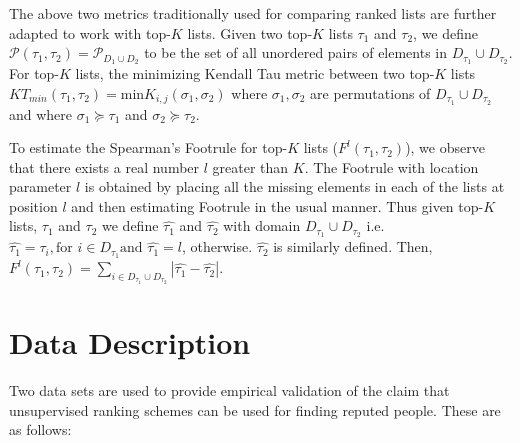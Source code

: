 \documentclass[a4paper,man,natbib]{apa6}
\begin{document}
The above two metrics traditionally used for comparing ranked lists are further adapted to work with top-$K$ lists. Given two top-$K$ lists $\tau_1$ and  $\tau_2$, we define $\mathcal{P}(\tau_1, \tau_2) = \mathcal{P}_{D_1 \cup D_2}$ to be the set of all unordered pairs of elements in $D_{\tau_1} \cup D_{\tau_2}$. For top-$K$ lists, the minimizing Kendall Tau metric between two top-$K$ lists $KT_{min}(\tau_1, \tau_2)= \text{min} K_{i,j} (\sigma_1, \sigma_2)$ where $\sigma_1, \sigma_2$ are permutations of $D_{\tau_1} \cup D_{\tau_2}$ and where $\sigma_1 \succeq \tau_1$ and $\sigma_2 \succeq \tau_2$.

To estimate the Spearman's Footrule for top-$K$ lists ($F^{l}(\tau_1, \tau_2)$), we observe that there exists a real number $l$ greater than $K$. The Footrule with location parameter $l$ is obtained by placing all the missing elements in each of the lists at position $l$ and then estimating Footrule in the usual manner. Thus given top-$K$ lists, $\tau_1$ and $\tau_2$ we define $\hat{\tau_1}$ and  $\hat{\tau_2}$ with domain  $D_{\tau_1} \cup D_{\tau_2}$ i.e. $\hat{\tau_1} = \tau_i, \text{for } i \in D_{\tau_1} \text{and } \hat{\tau_1} = l$, otherwise. $\hat{\tau_2}$ is similarly defined. Then, $F^{l}(\tau_1, \tau_2)= \sum_{i \in D_{\tau_1} \cup D_{\tau_2}} | \hat{\tau_1} - \hat{\tau_2}|$.

\section{Data Description}
\label{data}
Two data sets are used to provide empirical validation of the claim that unsupervised ranking schemes can be used for finding reputed people. These are as follows:
\end{document}
